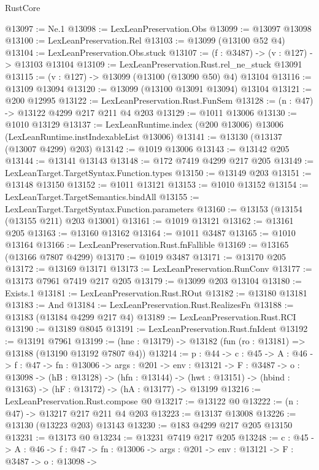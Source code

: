 \begin{lexlean}{RustCore}
\begin{coremodule}
@13097 := Ne.{1}
@13098 := LexLeanPreservation.Obs
@13099 := @13097 @13098
@13100 := LexLeanPreservation.Rel
@13103 := @13099 (@13100 @52 @4)
@13104 := LexLeanPreservation.Obs.stuck
@13107 := (f : @3487) -> (v : @127) -> @13103 @13104
@13109 := LexLeanPreservation.Rust.rel_ne_stuck @13091
@13115 := (v : @127) -> @13099 (@13100 (@13090 @50) @4) @13104
@13116 := @13109 @13094
@13120 := @13099 (@13100 @13091 @13094) @13104
@13121 := @200 @12995
@13122 := LexLeanPreservation.Rust.FunSem
@13128 := (n : @47) -> @13122 @4299 @217 @211 @4 @203
@13129 := @1011 @13006
@13130 := @1010 @13129
@13137 := LexLeanRuntime.index (@200 @13006) @13006 (LexLeanRuntime.instIndexableList @13006)
@13141 := @13130 (@13137 (@13007 @4299) @203)
@13142 := @1019 @13006
@13143 := @13142 @205
@13144 := @13141 @13143
@13148 := @172 @7419 @4299 @217 @205
@13149 := LexLeanTarget.TargetSyntax.Function.types
@13150 := @13149 @203
@13151 := @13148 @13150
@13152 := @1011 @13121
@13153 := @1010 @13152
@13154 := LexLeanTarget.TargetSemantics.bindAll
@13155 := LexLeanTarget.TargetSyntax.Function.parameters
@13160 := @13153 (@13154 (@13155 @211) @203 @13001)
@13161 := @1019 @13121
@13162 := @13161 @205
@13163 := @13160 @13162
@13164 := @1011 @3487
@13165 := @1010 @13164
@13166 := LexLeanPreservation.Rust.fnFallible
@13169 := @13165 (@13166 @7807 @4299)
@13170 := @1019 @3487
@13171 := @13170 @205
@13172 := @13169 @13171
@13173 := LexLeanPreservation.RunConv
@13177 := @13173 @7961 @7419 @217 @205
@13179 := @13099 @203 @13104
@13180 := Exists.{1}
@13181 := LexLeanPreservation.Rust.ROut
@13182 := @13180 @13181
@13183 := And
@13184 := LexLeanPreservation.Rust.RealizesFn
@13188 := @13183 (@13184 @4299 @217 @4)
@13189 := LexLeanPreservation.Rust.RCI
@13190 := @13189 @8045
@13191 := LexLeanPreservation.Rust.fnIdent
@13192 := @13191 @7961
@13199 := (hne : @13179) -> @13182 (fun (ro : @13181) => @13188 (@13190 @13192 @7807 @4))
@13214 := {p : @44} ->
  {c : @45} ->
  {A : @46} ->
  {f : @47} ->
  {fn : @13006} ->
  {args : @201} ->
  {env : @13121} ->
  {F : @3487} ->
  {o : @13098} ->
  (hB : @13128) ->
  (hfn : @13144) -> (hwt : @13151) -> (hbind : @13163) -> (hF : @13172) -> (hA : @13177) -> @13199
@13216 := LexLeanPreservation.Rust.compose @0
@13217 := @13122 @0
@13222 := (n : @47) -> @13217 @217 @211 @4 @203
@13223 := @13137 @13008
@13226 := @13130 (@13223 @203) @13143
@13230 := @183 @4299 @217 @205 @13150
@13231 := @13173 @0
@13234 := @13231 @7419 @217 @205
@13248 := {c : @45} ->
  {A : @46} ->
  {f : @47} ->
  {fn : @13006} ->
  {args : @201} ->
  {env : @13121} ->
  {F : @3487} ->
  {o : @13098} ->

\end{coremodule}
\end{lexlean}
